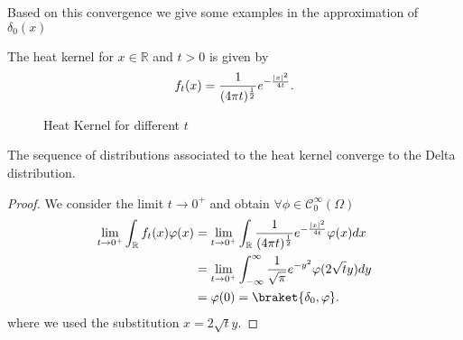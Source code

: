 Based on this convergence we give some examples in the approximation of $\delta_0(x)$
\begin{example}
 The heat kernel for $x \in  \mathbb{R}$ and $t>0$ is given by
 \begin{align*}
   f_t(x) = \frac{1}{(4\pi t)^{\frac{1}{2}}} e^{-\frac{\lvert x\rvert^2}{4t}} 
 .\end{align*}
\begin{figure}[H]
  \begin{center}
  \end{center}
  \caption{Heat Kernel for different $t$}
\end{figure}
\end{example}
\begin{lemma}
  The sequence of distributions associated to the heat kernel converge to the Delta distribution.
\end{lemma}
\begin{proof}
 We consider the limit $t\to 0^+$  and obtain $\forall \phi  \in  \mathcal{C}_0^{\infty}(\Omega ) $
 \begin{align*}
   \lim_{t \to 0^+} \int_\mathbb{R} f_t(x) \phi(x) &= \lim_{t \to  0^+} \int_\mathbb{R} \frac{1}{(4\pi t)^{\frac{1}{2}} } e^{-\frac{\abs{x}^2}{4t}} \phi(x)dx\\
                                                   &= \lim_{t \to 0^+} \int_{-\infty}^{\infty} \frac{1}{\sqrt{\pi} }  e^{-y^2}  \phi(2 \sqrt{t}y) dy \\
                                                   &= \phi(0) = \braket{\delta_0,\phi }
 .\end{align*}
 where we used the substitution $x = 2\sqrt{t}y $. 
\end{proof}
